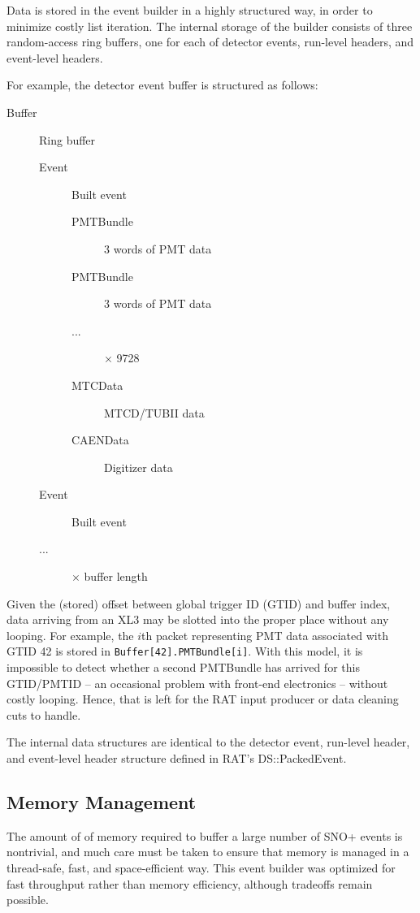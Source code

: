 \documentclass[11pt,twocolumn]{article}
\begin{document}
Data is stored in the event builder in a highly structured way, in order to minimize costly list iteration. The internal storage of the builder consists of three random-access ring buffers, one for each of detector events, run-level headers, and event-level headers.

For example, the detector event buffer is structured as follows:
\begin{description}
\item[Buffer] Ring buffer
\begin{description}
\item[Event] Built event
\begin{description}
\item[PMTBundle] 3 words of PMT data
\item[PMTBundle] 3 words of PMT data
\item[ ...] $\times$ 9728 
\item[MTCData] MTCD/TUBII data
\item[CAENData] Digitizer data
\end{description}
\item[Event] Built event
\item[...] $\times$ buffer length
\end{description}
\end{description}
Given the (stored) offset between global trigger ID (GTID) and buffer index, data arriving from an XL3 may be slotted into the proper place without any looping. For example, the $i$th packet representing PMT data associated with GTID 42 is stored in {\tt Buffer[42].PMTBundle[i]}. With this model, it is impossible to detect whether a second PMTBundle has arrived for this GTID/PMTID -- an occasional problem with front-end electronics -- without costly looping. Hence, that is left for the RAT input producer or data cleaning cuts to handle.

The internal data structures are identical to the detector event, run-level header, and event-level header structure defined in RAT's DS::PackedEvent.

\subsection{Memory Management}
The amount of of memory required to buffer a large number of SNO+ events is nontrivial, and much care must be taken to ensure that memory is managed in a thread-safe, fast, and space-efficient way. This event builder was optimized for fast throughput rather than memory efficiency, although tradeoffs remain possible.
\end{document}
